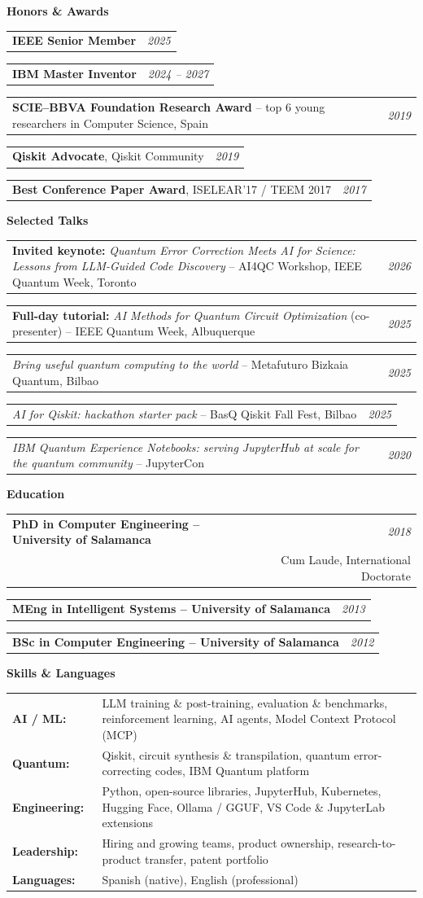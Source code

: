 \documentclass[a4paper,10pt]{article}
\makeatletter
\newcommand{\cvsection}[1]{%
  \vspace{2.5mm}%
  \begin{tcolorbox}{\headfont\bfseries\large\color{accent} #1}\end{tcolorbox}%
  \vspace{-1.5mm}%
}
\newcommand{\resumeSubheading}[4]{%
  \begin{tabularx}{\linewidth}{@{}X r@{}}
    \textbf{#1} & \textit{\footnotesize #4} \\
    \textit{\footnotesize #3} & \footnotesize #2
  \end{tabularx}\par\vspace{1mm}}
\newcommand{\entry}[2]{%
  \begin{tabularx}{\linewidth}{@{}>{\raggedright\arraybackslash}X@{\hspace{4mm}}r@{}}
    #1 & \textit{\footnotesize #2}
  \end{tabularx}\par\vspace{0.4mm}}
\makeatother
\begin{document}
\cvsection{Honors \& Awards}
\entry{\textbf{IEEE Senior Member}}{2025}
\entry{\textbf{IBM Master Inventor}}{2024 -- 2027}
\entry{\textbf{SCIE--BBVA Foundation Research Award} -- top 6 young researchers in Computer Science, Spain}{2019}
\entry{\textbf{Qiskit Advocate}, Qiskit Community}{2019}
\entry{\textbf{Best Conference Paper Award}, ISELEAR'17 / TEEM 2017}{2017}

\cvsection{Selected Talks}
\entry{\textbf{Invited keynote:} \textit{Quantum Error Correction Meets AI for Science: Lessons from LLM-Guided Code Discovery} -- AI4QC Workshop, IEEE Quantum Week, Toronto}{2026}
\entry{\textbf{Full-day tutorial:} \textit{AI Methods for Quantum Circuit Optimization} (co-presenter) -- IEEE Quantum Week, Albuquerque}{2025}
\entry{\textit{Bring useful quantum computing to the world} -- Metafuturo Bizkaia Quantum, Bilbao}{2025}
\entry{\textit{AI for Qiskit: hackathon starter pack} -- BasQ Qiskit Fall Fest, Bilbao}{2025}
\entry{\textit{IBM Quantum Experience Notebooks: serving JupyterHub at scale for the quantum community} -- JupyterCon}{2020}

\cvsection{Education}
\resumeSubheading{PhD in Computer Engineering -- University of Salamanca}{Cum Laude, International Doctorate}{}{2018}
\entry{\textbf{MEng in Intelligent Systems -- University of Salamanca}}{2013}
\entry{\textbf{BSc in Computer Engineering -- University of Salamanca}}{2012}

\cvsection{Skills \& Languages}
{\small
\begin{tabularx}{\linewidth}{@{}l X@{}}
\textbf{AI / ML:\ } & LLM training \& post-training, evaluation \& benchmarks, reinforcement learning, AI agents, Model Context Protocol (MCP) \\
\textbf{Quantum:\ } & Qiskit, circuit synthesis \& transpilation, quantum error-correcting codes, IBM Quantum platform \\
\textbf{Engineering:\ } & Python, open-source libraries, JupyterHub, Kubernetes, Hugging Face, Ollama / GGUF, VS Code \& JupyterLab extensions \\
\textbf{Leadership:\ } & Hiring and growing teams, product ownership, research-to-product transfer, patent portfolio \\
\textbf{Languages:\ } & Spanish (native), English (professional) \\
\end{tabularx}
}
\end{document}

